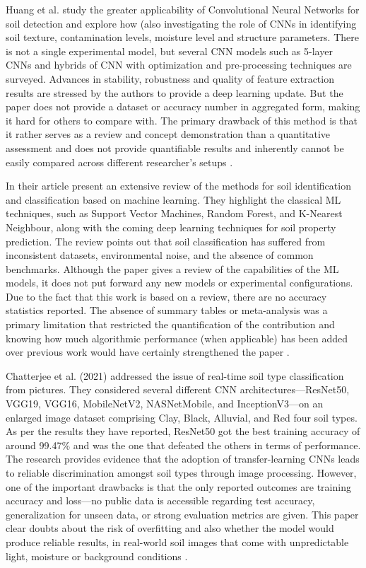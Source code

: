\documentclass[conference]{IEEEtran}
\begin{document}
Huang et al. \cite{b8} study the greater applicability of Convolutional Neural Networks for soil detection and explore how (also investigating the role of CNNs in identifying soil texture, contamination levels, moisture level and structure parameters. There is not a single experimental model, but several CNN models such as 5-layer CNNs and hybrids of CNN with optimization and pre-processing techniques are surveyed. Advances in stability, robustness and quality of feature extraction results are stressed by the authors to provide a deep learning update. But the paper does not provide a dataset or accuracy number in aggregated form, making it hard for others to compare with. The primary drawback of this method is that it rather serves as a review and concept demonstration than a quantitative assessment and does not provide quantifiable results and inherently cannot be easily compared across different researcher’s setups \cite{b8}.
\vspace{5pt}


In their article present an extensive review of the methods for soil identification and classification based on machine learning. They highlight the classical ML techniques, such as Support Vector Machines, Random Forest, and K-Nearest Neighbour, along with the coming deep learning techniques for soil property prediction. The review points out that soil classification has suffered from inconsistent datasets, environmental noise, and the absence of common benchmarks. Although the paper gives a review of the capabilities of the ML models, it does not put forward any new models or experimental configurations. Due to the fact that this work is based on a review, there are no accuracy statistics reported. The absence of summary tables or meta-analysis was a primary limitation that restricted the quantification of the contribution and knowing how much algorithmic performance (when applicable) has been added over previous work would have certainly strengthened the paper \cite{b9}.
\vspace{5pt}


Chatterjee et al. (2021)\cite{b10} addressed the issue of real-time soil type classification from pictures. They considered several different CNN architectures—ResNet50, VGG19, VGG16, MobileNetV2, NASNetMobile, and InceptionV3—on an enlarged image dataset comprising Clay, Black, Alluvial, and Red four soil types. As per the results they have reported, ResNet50 got the best training accuracy of around 99.47\% and was the one that defeated the others in terms of performance. The research provides evidence that the adoption of transfer-learning CNNs leads to reliable discrimination amongst soil types through image processing. However, one of the important drawbacks is that the only reported outcomes are training accuracy and loss—no public data is accessible regarding test accuracy, generalization for unseen data, or strong evaluation metrics are given. This paper clear doubts about the risk of overfitting and also whether the model would produce reliable results, in real-world soil images that come with unpredictable light, moisture or background conditions \cite{b10}.
\vspace{5pt}
\end{document}

